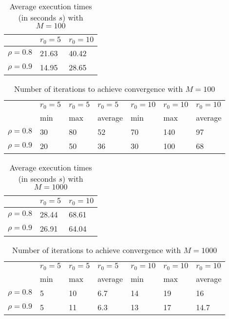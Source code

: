\documentclass[a4paper,11pt,openright]{report}
\begin{document}
\begin{table}[H]
\centering
\addtolength{\leftskip}{-1.5cm}
\addtolength{\rightskip}{-1.5cm}
\begin{tabular}{|c|ll|}
\hline
$ $ & $r_0 = 5$ & $r_0 = 10$ \\
\hline
$\rho = 0.8$ & 21.63 & 40.42 \\
$\rho = 0.9$ & 14.95 & 28.65 \\
\hline
\end{tabular}
\caption{Average execution times (in seconds $s$) with $M = 100$}
\end{table}
\begin{table}[H]
\centering
\addtolength{\leftskip}{-1.5cm}
\addtolength{\rightskip}{-1.5cm}
\begin{tabular}{|c|llllll|}
\hline
$ $ & $r_0 = 5$ & $r_0 = 5$ & $r_0 = 5$ & $r_0 = 10$ & $r_0 = 10$ & $r_0 = 10$ \\
$ $ & min & max & average & min & max & average \\
\hline
$\rho = 0.8$ & 30 & 80 & 52 & 70 & 140 & 97 \\
$\rho = 0.9$ & 20 & 50 & 36 & 30 & 100 & 68 \\
\hline
\end{tabular}
\caption{Number of iterations to achieve convergence with $M = 100$}
\end{table}
\begin{table}[H]
\centering
\addtolength{\leftskip}{-1.5cm}
\addtolength{\rightskip}{-1.5cm}
\begin{tabular}{|c|ll|}
\hline
$ $ & $r_0 = 5$ & $r_0 = 10$ \\
\hline
$\rho = 0.8$ & 28.44 & 68.61 \\
$\rho = 0.9$ & 26.91 & 64.04 \\
\hline
\end{tabular}
\caption{Average execution times (in seconds $s$) with $M = 1000$}
\end{table}
\begin{table}[H]
\centering
\addtolength{\leftskip}{-1.5cm}
\addtolength{\rightskip}{-1.5cm}
\begin{tabular}{|c|llllll|}
\hline
$ $ & $r_0 = 5$ & $r_0 = 5$ & $r_0 = 5$ & $r_0 = 10$ & $r_0 = 10$ & $r_0 = 10$ \\
$ $ & min & max & average & min & max & average \\
\hline
$\rho = 0.8$ & 5 & 10 & 6.7 & 14 & 19 & 16 \\
$\rho = 0.9$ & 5 & 11 & 6.3 & 13 & 17 & 14.7 \\
\hline
\end{tabular}
\caption{Number of iterations to achieve convergence with $M = 1000$}
\end{table}
\newpage
\end{document}
